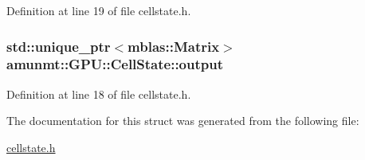 Definition at line 19 of file cellstate.\+h.

\subsubsection[{\texorpdfstring{output}{output}}]{\setlength{\rightskip}{0pt plus 5cm}std\+::unique\+\_\+ptr$<${\bf mblas\+::\+Matrix}$>$ amunmt\+::\+G\+P\+U\+::\+Cell\+State\+::output}\hypertarget{structamunmt_1_1GPU_1_1CellState_ac2d94a4fd199fe8458529a075b9df1b7}{}\label{structamunmt_1_1GPU_1_1CellState_ac2d94a4fd199fe8458529a075b9df1b7}


Definition at line 18 of file cellstate.\+h.



The documentation for this struct was generated from the following file\+:\begin{DoxyCompactItemize}
\item 
\hyperlink{cellstate_8h}{cellstate.\+h}\end{DoxyCompactItemize}
